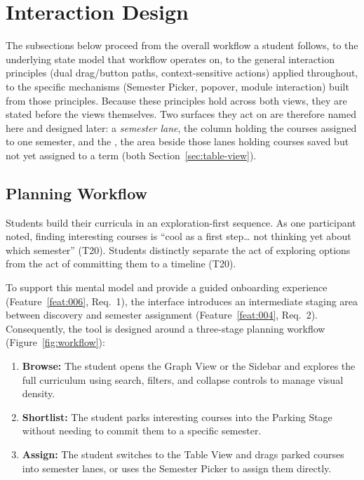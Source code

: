 \section{Interaction Design}
\label{sec:interaction}
The subsections below proceed from the overall workflow a student follows, to the underlying state model that workflow operates on, to the general interaction principles (dual drag/button paths, context-sensitive actions) applied throughout, to the specific mechanisms (Semester Picker, popover, module interaction) built from those principles. Because these principles hold across both views, they are stated before the views themselves. Two surfaces they act on are therefore named here and designed later: a \emph{semester lane}, the column holding the courses assigned to one semester, and the , the area beside those lanes holding courses saved but not yet assigned to a term (both Section~\ref{sec:table-view}).


\subsection{Planning Workflow}
\label{sec:workflow}

Students build their curricula in an exploration-first sequence. As one participant noted, finding interesting courses is \enquote{cool as a first step… not thinking yet about which semester} (T20). Students distinctly separate the act of exploring options from the act of committing them to a timeline (T20). 

To support this mental model and provide a guided onboarding experience (Feature~\ref{feat:006}, Req.~1), the interface introduces an intermediate staging area between discovery and semester assignment (Feature~\ref{feat:004}, Req.~2). Consequently, the tool is designed around a three-stage planning workflow (Figure~\ref{fig:workflow}):
\begin{enumerate}
  \item \textbf{Browse:} The student opens the Graph View or the Sidebar and explores the full curriculum using search, filters, and collapse controls to manage visual density.
  \item \textbf{Shortlist:} The student parks interesting courses into the Parking Stage without needing to commit them to a specific semester.
  \item \textbf{Assign:} The student switches to the Table View and drags parked courses into semester lanes, or uses the Semester Picker to assign them directly.
\end{enumerate}

